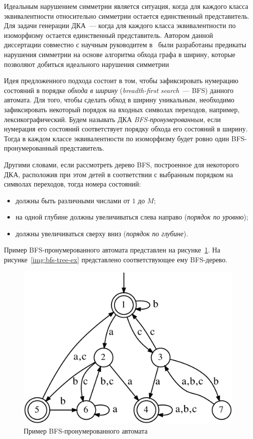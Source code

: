 Идеальным нарушением симметрии является ситуация, когда для каждого класса эквивалентности относительно симметрии остается единственный представитель. 
Для задачи генерации ДКА~{---} когда для каждого класса эквивалентности по изоморфизму остается единственный представитель.
Автором данной диссертации совместно с научным руководитем  в~\cite{zakirzyanov2015LATA} были разработаны предикаты нарушения симметрии на основе алгоритма обхода графа в ширину, которые позволяют добиться идеального нарушения симметрии

Идея предложенного подхода состоит в том, чтобы зафиксировать нумерацию состояний в порядке \emph{обхода в ширину} (\emph{breadth-first search}~{---} BFS) данного автомата.
Для того, чтобы сделать обход в ширину уникальным, необходимо зафиксировать некоторый порядок на входных символах переходов, например, лексикографический. 
Будем называть ДКА \emph{BFS-пронумерованным}, если нумерация его состояний соответствует порядку обхода его состояний в ширину.
Тогда в каждом классе эквивалентности по изоморфизму будет ровно один BFS-пронумерованный представитель.

Другими словами, если рассмотреть дерево BFS, построенное для некоторого ДКА, расположив при этом детей в соответствии с выбранным порядком на символах переходов, тогда номера состояний:
\begin{itemize}
  \item должны быть различными числами от $1$ до $M$;
  \item на одной глубине должны увеличиваться слева направо (\emph{порядок по уровню});
  \item должны увеличиваться сверху вниз (\emph{порядок по глубине}).
\end{itemize}
Пример BFS-пронумерованного автомата представлен на рисунке~\ref{img:bfs-ex}.
На рисунке~\ref{img:bfs-tree-ex} представлено соответствующее ему BFS-дерево.

\begin{figure}[ht]
  \centering
  \includegraphics[scale=0.15]{img/datamod/BFS-example.eps}
  \caption{Пример BFS-пронумерованного автомата}
  \label{img:bfs-ex}
\end{figure}

